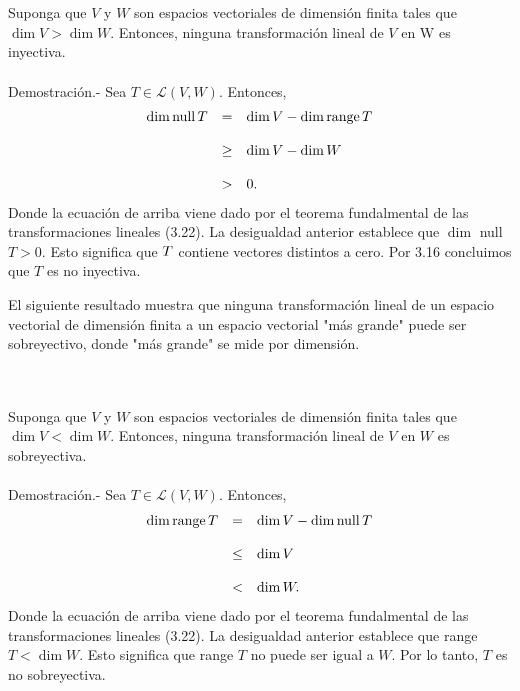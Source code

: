 \begin{myteo}\,\\\\
    Suponga que $V$ y $W$ son espacios vectoriales de dimensión finita tales que $\dim V>\dim W$. Entonces, ninguna transformación lineal de $V$ en W es inyectiva.\\\\
	Demostración.-\; Sea $T\in \mathcal{L}(V,W)$. Entonces,
	$$
	\begin{array}{rcl}
	    \dim \operatorname{null} T &=& \dim V - \dim \operatorname{range} T\\\\
				 &\geq & \dim V - \dim W\\\\
				 &>& 0.
	\end{array}
	$$
	Donde la ecuación de arriba viene dado por el teorema fundalmental de las transformaciones lineales (3.22). La desigualdad anterior establece que $\dim$ null $T > 0$. Esto significa que $\null T$ contiene vectores distintos a cero. Por 3.16 concluimos que $T$ es no inyectiva.
\end{myteo}

El siguiente resultado muestra que ninguna transformación lineal de un espacio vectorial de dimensión finita a un espacio vectorial "más grande" puede ser sobreyectivo, donde "más grande" se mide por dimensión.

\begin{myteo}\,\\\\
    Suponga que $V$ y $W$ son espacios vectoriales de dimensión finita tales que $\dim V<\dim W$. Entonces, ninguna transformación lineal de $V$ en $W$ es sobreyectiva.\\\\
	Demostración.-\; Sea $T\in \mathcal{L}(V,W)$. Entonces,
	$$
	\begin{array}{rcl}
	    \dim \operatorname{range} T &=& \dim V - \dim \operatorname{null} T\\\\
				  &\leq & \dim V\\\\
				  &<& \dim W.
	\end{array}
	$$
	Donde la ecuación de arriba viene dado por el teorema fundalmental de las transformaciones lineales (3.22). La desigualdad anterior establece que range $T < \dim W$. Esto significa que range $T$ no puede ser igual a $W$.  Por lo tanto, $T$ es no sobreyectiva.\\\\
\end{myteo}

